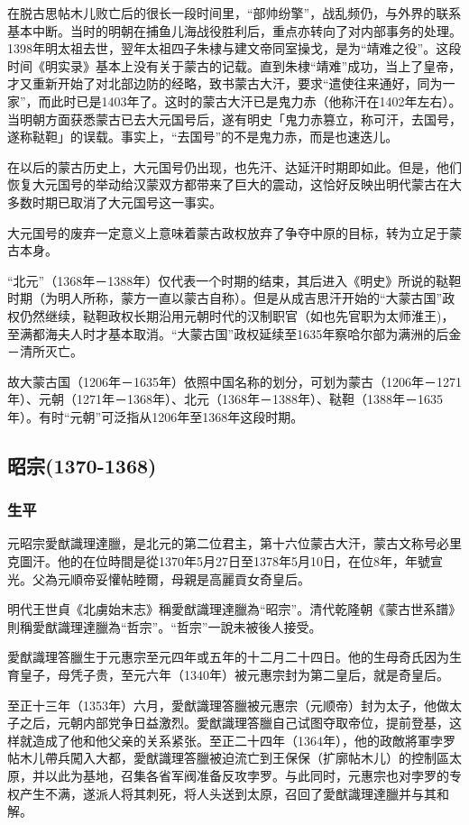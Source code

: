 在脱古思帖木儿败亡后的很长一段时间里，“部帅纷擎”，战乱频仍，与外界的联系基本中断。当时的明朝在捕鱼儿海战役胜利后，重点亦转向了对内部事务的处理。1398年明太祖去世，翌年太祖四子朱棣与建文帝同室操戈，是为“靖难之役”。这段时间《明实录》基本上没有关于蒙古的记载。直到朱棣“靖难”成功，当上了皇帝，才又重新开始了对北部边防的经略，致书蒙古大汗，要求“遣使往来通好，同为一家”，而此时已是1403年了。这时的蒙古大汗已是鬼力赤（他称汗在1402年左右）。当明朝方面获悉蒙古已去大元国号后，遂有明史「鬼力赤篡立，称可汗，去国号，遂称鞑靼」的误载。事实上，“去国号”的不是鬼力赤，而是也速迭儿。

在以后的蒙古历史上，大元国号仍出现，也先汗、达延汗时期即如此。但是，他们恢复大元国号的举动给汉蒙双方都带来了巨大的震动，这恰好反映出明代蒙古在大多数时期已取消了大元国号这一事实。

大元国号的废弃一定意义上意味着蒙古政权放弃了争夺中原的目标，转为立足于蒙古本身。

“北元”（1368年－1388年）仅代表一个时期的结束，其后进入《明史》所说的鞑靼时期（为明人所称，蒙方一直以蒙古自称）。但是从成吉思汗开始的“大蒙古国”政权仍然继续，鞑靼政权长期沿用元朝时代的汉制职官（如也先官职为太师淮王)，至满都海夫人时才基本取消。“大蒙古国”政权延续至1635年察哈尔部为满洲的后金－清所灭亡。

故大蒙古国（1206年－1635年）依照中国名称的划分，可划为蒙古（1206年－1271年）、元朝（1271年－1368年）、北元（1368年－1388年）、鞑靼（1388年－1635年）。有时“元朝”可泛指从1206年至1368年这段时期。

\subsection{昭宗\tiny(1370-1368)}

\subsubsection{生平}

元昭宗愛猷識理達臘，是北元的第二位君主，第十六位蒙古大汗，蒙古文称号必里克圖汗。他的在位時間是從1370年5月27日至1378年5月10日，在位8年，年號宣光。父為元順帝妥懽帖睦爾，母親是高麗貢女奇皇后。

明代王世貞《北虜始末志》稱愛猷識理達臘為“昭宗”。清代乾隆朝《蒙古世系譜》則稱愛猷識理達臘為“哲宗”。“哲宗”一說未被後人接受。

愛猷識理答臘生于元惠宗至元四年或五年的十二月二十四日。他的生母奇氏因为生育皇子，母凭子贵，至元六年（1340年）被元惠宗封为第二皇后，就是奇皇后。

至正十三年（1353年）六月，愛猷識理答臘被元惠宗（元顺帝）封为太子，他做太子之后，元朝内部党争日益激烈。愛猷識理答臘自己试图夺取帝位，提前登基，这样就造成了他和他父亲的关系紧张。至正二十四年（1364年），他的政敵將軍孛罗帖木儿帶兵闖入大都，愛猷識理答臘被迫流亡到王保保（扩廓帖木儿）的控制區太原，并以此为基地，召集各省军阀准备反攻孛罗。与此同时，元惠宗也对孛罗的专权产生不满，遂派人将其刺死，将人头送到太原，召回了愛猷識理達臘并与其和解。

